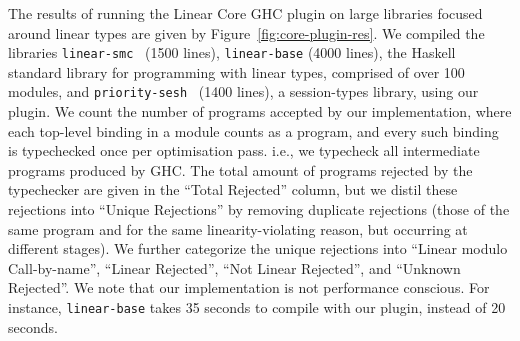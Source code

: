 \documentclass[acmsmall,review,anonymous]{acmart}
\begin{document}
%
%
%
%

The results of running the Linear Core GHC plugin on large 
libraries focused around linear types are given by
Figure~\ref{fig:core-plugin-res}.
%
We compiled the libraries \texttt{linear-smc}~\cite{10.1145/3471874.3472980} (1500 lines), \texttt{linear-base} (4000
lines), the Haskell standard library for programming with linear types,
comprised of over 100 modules, and
\texttt{priority-sesh}~\cite{10.1145/3471874.3472979} (1400 lines), a
session-types library, using our plugin.
%
We count the number of programs accepted by our implementation, where
each top-level binding in a module counts as a program, and every such
binding is typechecked once per optimisation pass. i.e., we typecheck
all intermediate programs produced by GHC. The total amount of
programs rejected by the typechecker are given in the ``Total
Rejected'' column, but we distil these rejections into ``Unique
Rejections'' by removing duplicate rejections (those of the same
program and for the same linearity-violating reason, but occurring at
different stages). We further categorize the unique rejections into
``Linear modulo Call-by-name'', ``Linear Rejected'', ``Not Linear
Rejected'', and ``Unknown Rejected''.  We note that our implementation
is not performance conscious. For instance, \texttt{linear-base} takes
35 seconds to compile with our plugin, instead of 20 seconds.
%
\end{document}
